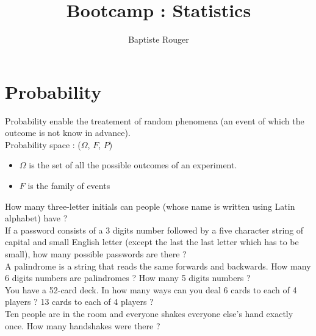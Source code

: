 \documentclass[10pt,a4paper]{article}
\author{Baptiste Rouger}
\title{Bootcamp : Statistics}
\begin{document}
\maketitle

\begin{flushright}
\end{flushright}

\tableofcontents

\newpage

\part{Probability}

Probability enable the treatement of random phenomena (an event of which the outcome is not know in advance).\\
Probability space : ($\Omega$, $F$, $P$)\\
\begin{itemize}
  \item $\Omega$ is the set of all the possible outcomes of an experiment.
  \item $F$ is the family of events
\end{itemize}

How many three-letter initials can people (whose name is written using Latin alphabet) have ?\\
If a password consists of a 3 digits number followed by a five character string of capital and small English letter (except the last the last letter which has to be small), how many possible passwords are there ?\\
A palindrome is a string that reads the same forwards and backwards. How many 6 digits numbers are palindromes ? How many 5 digits numbers ?\\
You have a 52-card deck. In how many ways can you deal 6 cards to each of 4 players ? 13 cards to each of 4 players ?\\
Ten people are in the room and everyone shakes everyone else's hand exactly once. How many handshakes were there ?
\end{document}
